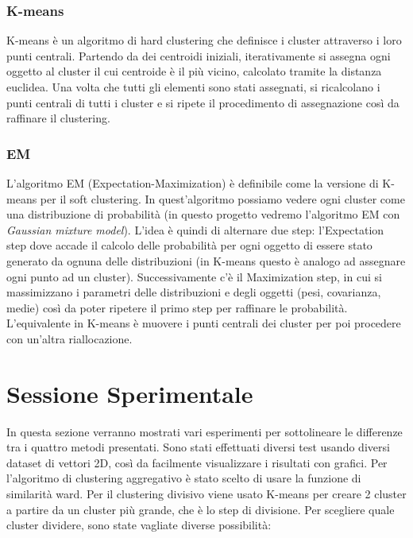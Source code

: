 \documentclass{llncs}
\begin{document}
	\subsubsection{K-means}
	K-means è un algoritmo di hard clustering che definisce i cluster attraverso i loro punti centrali.
	Partendo da dei centroidi iniziali, iterativamente si assegna ogni oggetto al cluster il cui centroide è
	il più vicino, calcolato tramite la distanza euclidea. Una volta che tutti gli elementi sono stati assegnati, si ricalcolano i punti centrali di tutti
	i cluster e si ripete il procedimento di assegnazione così da raffinare il clustering.

	\subsubsection{EM}
	L'algoritmo EM (Expectation-Maximization) è definibile come la versione di K-means per il soft clustering.
	In quest'algoritmo possiamo vedere ogni cluster come una distribuzione di probabilità (in questo progetto vedremo l'algoritmo EM con \textit{Gaussian mixture model}).
	L'idea è quindi di alternare due step: l'Expectation step dove accade il calcolo delle probabilità per ogni oggetto di essere stato generato da ognuna delle distribuzioni 
	(in K-means questo è analogo ad assegnare ogni punto ad un cluster). 
	Successivamente c'è il Maximization step, in cui si massimizzano i parametri delle distribuzioni e degli oggetti (pesi, covarianza, medie) così da poter ripetere il primo step
	per raffinare le probabilità. 
	L'equivalente in K-means è muovere i punti centrali dei cluster per poi procedere con un'altra riallocazione.

	\section{Sessione Sperimentale}
	In questa sezione verranno mostrati vari esperimenti per sottolineare le differenze tra i quattro metodi presentati. Sono stati effettuati diversi test usando diversi dataset di vettori 2D, 
	così da facilmente visualizzare i risultati con grafici. Per l'algoritmo di clustering aggregativo è stato scelto di usare la funzione di similarità ward. 
	Per il clustering	divisivo viene usato K-means per creare 2 cluster a partire da un cluster più grande, che è lo step di divisione. Per scegliere quale cluster dividere, 
	sono state vagliate diverse possibilità:
	
\end{document}
